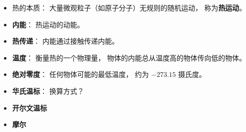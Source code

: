 
\begin{issues}
\issueDraft
\end{issues}

\begin{itemize}
\item 热的本质： 大量微观粒子（如原子分子）无规则的随机运动， 称为\textbf{热运动}。
\item \textbf{内能}： 热运动的动能。
\item \textbf{热传递}： 内能通过接触传递内能。
\item \textbf{温度}： 衡量热的一个物理量， 物体的内能总从温度高的物体传向低的物体。
\item \textbf{绝对零度}： 任何物体可能的最低温度， 约为 $-273.15$ 摄氏度。
\item \textbf{华氏温标}： 换算方式？
\item \textbf{开尔文温标}
\item \textbf{摩尔}
\end{itemize}
